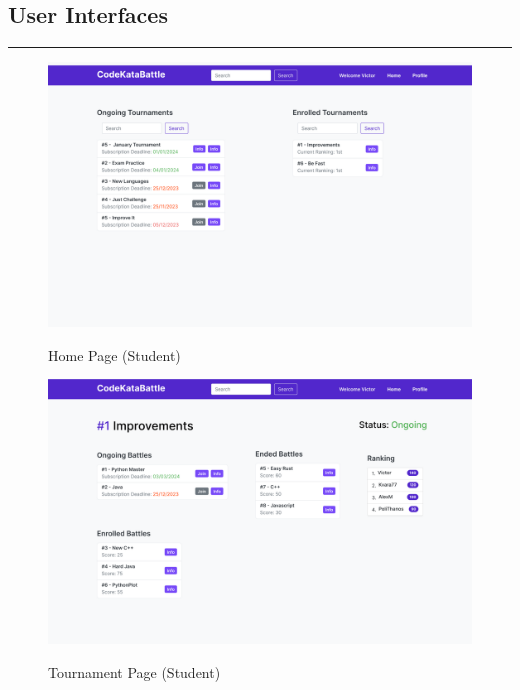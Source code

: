\documentclass{Configuration_Files/Template}
\begin{document}
\subsection{User Interfaces}

{\color{bluepoli}\rule{\linewidth}{0.1pt}}

\begin{figure}[H]
\centering
\includegraphics[scale = 0.25]{Images/UI/MainPage_Student.png}\\
\caption{Home Page (Student)}
\end{figure}

\begin{figure}[H]
\centering
\includegraphics[scale = 0.25]{Images/UI/TournamentPage_Student.png}\\
\caption{Tournament Page (Student)}
\end{figure}
\end{document}
